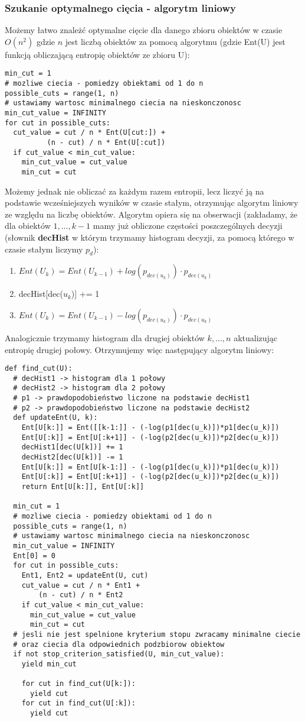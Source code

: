 \documentclass[magisterska]{pracamgr}
\theoremstyle{plain}
\theoremstyle{definition}
\theoremstyle{remark}
\begin{document}
\subsubsection{Szukanie optymalnego cięcia - algorytm liniowy}
Możemy łatwo znależć optymalne cięcie dla danego zbioru obiektów w czasie $O(n^2)$ gdzie $n$ jest
liczbą obiektów za pomocą algorytmu (gdzie Ent(U) jest funkcją obliczającą entropię obiektów ze zbioru U):
\begin{lstlisting}
min_cut = 1
# mozliwe ciecia - pomiedzy obiektami od 1 do n
possible_cuts = range(1, n)
# ustawiamy wartosc minimalnego ciecia na nieskonczonosc
min_cut_value = INFINITY
for cut in possible_cuts:
  cut_value = cut / n * Ent(U[cut:]) + 
	      (n - cut) / n * Ent(U[:cut])
  if cut_value < min_cut_value:
    min_cut_value = cut_value
    min_cut = cut	      
\end{lstlisting}
Możemy jednak nie obliczać za każdym razem entropii, lecz liczyć ją na podstawie 
wcześniejszych wyników w czasie stałym, otrzymując algorytm liniowy ze względu na liczbę 
obiektów. Algorytm opiera się na obserwacji (zakładamy, że dla obiektów $1, ..., k-1$ mamy już obliczone 
częstości poszczególnych decyzji (słownik \textbf{decHist} w którym trzymamy histogram decyzji, za pomocą którego w czasie stałym
liczymy $p_d$):
\begin{enumerate}
 \item $Ent(U_k) = Ent(U_{k-1}) + log(p_{dec(u_k)}) \cdot p_{dec(u_k)}$
 \item decHist[dec($u_k$)] += 1
 \item $Ent(U_k) = Ent(U_{k-1}) - log(p_{dec(u_k)}) \cdot p_{dec(u_k)}$
\end{enumerate}
Analogicznie trzymamy histogram dla drugiej obiektów $k, ..., n$ aktualizując entropię drugiej połowy.
Otrzymujemy więc następujący algorytm liniowy:
\begin{lstlisting}
def find_cut(U):
  # decHist1 -> histogram dla 1 połowy
  # decHist2 -> histogram dla 2 połowy
  # p1 -> prawdopodobieństwo liczone na podstawie decHist1
  # p2 -> prawdopodobieństwo liczone na podstawie decHist2
  def updateEnt(U, k):
    Ent[U[k:]] = Ent([[k-1:]] - (-log(p1[dec(u_k)])*p1[dec(u_k)])
    Ent[U[:k]] = Ent[U[:k+1]] - (-log(p2[dec(u_k)])*p2[dec(u_k)])
    decHist1[dec(U[k])] += 1    
    decHist2[dec(U[k])] -= 1
    Ent[U[k:]] = Ent[U[k-1:]] - (-log(p1[dec(u_k)])*p1[dec(u_k)])
    Ent[U[:k]] = Ent[U[:k+1]] - (-log(p2[dec(u_k)])*p2[dec(u_k)])
    return Ent[U[k:]], Ent[U[:k]]
    
  min_cut = 1
  # mozliwe ciecia - pomiedzy obiektami od 1 do n
  possible_cuts = range(1, n)
  # ustawiamy wartosc minimalnego ciecia na nieskonczonosc
  min_cut_value = INFINITY
  Ent[0] = 0
  for cut in possible_cuts:
    Ent1, Ent2 = updateEnt(U, cut)
    cut_value = cut / n * Ent1 + 
		(n - cut) / n * Ent2
    if cut_value < min_cut_value:
      min_cut_value = cut_value
      min_cut = cut	
  # jesli nie jest spelnione kryterium stopu zwracamy minimalne ciecie
  # oraz ciecia dla odpowiednich podzbiorow obiektow
  if not stop_criterion_satisfied(U, min_cut_value):
    yield min_cut
    
    for cut in find_cut(U[k:]):
      yield cut 
    for cut in find_cut(U[:k]):
      yield cut
\end{lstlisting}
\end{document}
